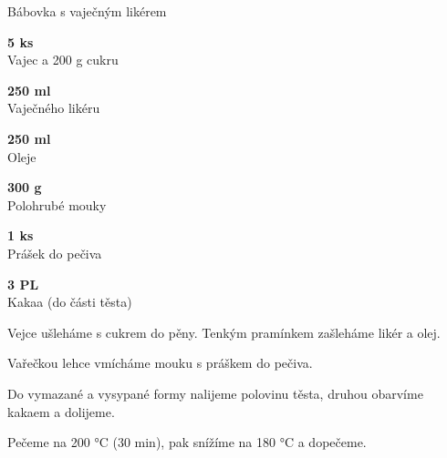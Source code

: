 \documentclass[11pt,a4paper]{article}
\begin{document}
\begin{recipe}[Goldenrod]{Bábovka s vaječným likérem}
    \begin{ingredients}
        \item \parbox[t]{\linewidth}{\raggedright \piece \textbf{5 ks}\\ Vajec a 200 g cukru}
        \item \parbox[t]{\linewidth}{\raggedright \liquid \textbf{250 ml}\\ Vaječného likéru}
        \item \parbox[t]{\linewidth}{\raggedright \liquid \textbf{250 ml}\\ Oleje}
        \item \parbox[t]{\linewidth}{\raggedright \weight \textbf{300 g}\\ Polohrubé mouky}
        \item \parbox[t]{\linewidth}{\raggedright \piece \textbf{1 ks}\\ Prášek do pečiva}
        \item \parbox[t]{\linewidth}{\raggedright \spoon \textbf{3 PL}\\ Kakaa (do části těsta)}
    \end{ingredients}
    \begin{steps}
        \item Vejce ušleháme s cukrem do pěny. Tenkým pramínkem zašleháme likér a olej.
        \item Vařečkou lehce vmícháme mouku s práškem do pečiva.
        \item Do vymazané a vysypané formy nalijeme polovinu těsta, druhou obarvíme kakaem a dolijeme.
        \item Pečeme na 200 °C (30 min), pak snížíme na 180 °C a dopečeme.
    \end{steps}
\end{recipe}
\end{document}
